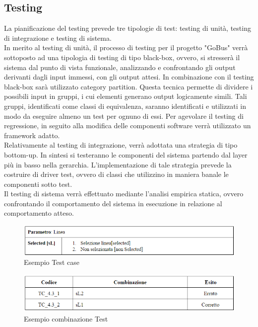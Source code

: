 \subsection{Testing}
La pianificazione del testing prevede tre tipologie di test: testing di unit\`{a}, testing di integrazione e testing di sistema.\\
In merito al testing di unit\`{a}, il processo di testing per il progetto "GoBus" verr\`{a} sottoposto ad una tipologia di testing di tipo black-box, ovvero, si stresser\`{a} il sistema dal punto di vista funzionale, analizzando e confrontando gli output derivanti dagli input immessi, con gli output attesi. In combinazione con il testing black-box sar\`{a} utilizzato category partition. Questa tecnica permette di dividere i possibili input in gruppi, i cui elementi generano output logicamente simili. Tali gruppi, identificati come classi di equivalenza, saranno identificati e utilizzati in modo da eseguire almeno un test per ognuno di essi. Per agevolare il testing di regressione, in seguito alla modifica delle componenti software verr\`{a} utilizzato un framework adatto.\\
Relativamente al testing di integrazione, verr\`{a} adottata una strategia di tipo bottom-up. In sintesi si testeranno le componenti del sistema partendo dal layer più in basso nella gerarchia. L\rq implementazione di tale strategia prevede la costruire di driver test, ovvero di classi che utilizzino in maniera banale le componenti sotto test.\\
Il testing di sistema verr\`{a} effettuato mediante l\rq analisi empirica statica, ovvero confrontando il comportamento del sistema in esecuzione in relazione al comportamento atteso.\\

\begin{figure}[h]
\centering
\includegraphics[scale=.6]{img/21.png}
\caption{Esempio Test case }
\label{fig:mhs}
\end{figure}  

\begin{figure}[h]
\centering
\includegraphics[scale=.6]{img/22.png}
\caption{Esempio combinazione Test}
\label{fig:mhs}
\end{figure} 


